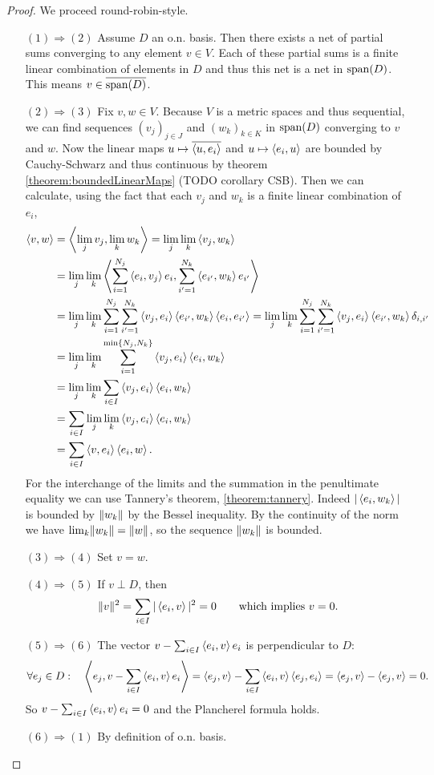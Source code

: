 \begin{proof}
We proceed round-robin-style.
\begin{itemize}[leftmargin=2cm]
\item[$\boxed{(1) \Rightarrow (2)}$] Assume $D$ an o.n. basis. Then there exists a net of partial sums converging to any element $v\in V$. Each of these partial sums is a finite linear combination of elements in $D$ and thus this net is a net in $\operatorname{span}(D)$. This means $v\in\overline{\operatorname{span}(D)}$.
\item[$\boxed{(2) \Rightarrow (3)}$] Fix $v,w\in V$. Because $V$ is a metric spaces and thus sequential, we can find sequences $(v_j)_{j\in J}$ and $(w_k)_{k\in K}$ in $\operatorname{span}(D)$ converging to $v$ and $w$. Now the linear maps $u\mapsto \overline{\left\langle u, e_i \right\rangle}$ and $u\mapsto \left\langle e_i, u \right\rangle$ are bounded by Cauchy-Schwarz and thus continuous by theorem \ref{theorem:boundedLinearMaps} (TODO corollary CSB). Then we can calculate, using the fact that each $v_j$ and $w_k$ is a finite linear combination of $e_i$,
\begin{align*}
\left\langle v,w \right\rangle &= \left\langle \lim_{j}v_j, \lim_k w_k \right\rangle = \lim_{j}\lim_{k}\left\langle v_j,w_k \right\rangle \\
&= \lim_{j}\lim_{k}\left\langle \sum_{i=1}^{N_{j}}\left\langle e_i,v_j \right\rangle e_i,\sum_{i'=1}^{N_k}\left\langle e_{i'},w_k \right\rangle e_{i'} \right\rangle \\
&= \lim_{j}\lim_{k}\sum_{i=1}^{N_{j}}\sum_{i'=1}^{N_k}\left\langle v_j,e_i \right\rangle\left\langle e_{i'},w_k \right\rangle\left\langle e_i,e_{i'} \right\rangle = \lim_{j}\lim_{k}\sum_{i=1}^{N_{j}}\sum_{i'=1}^{N_k}\left\langle v_j,e_i \right\rangle\left\langle e_{i'},w_k \right\rangle\delta_{i,i'} \\
&= \lim_{j}\lim_{k}\sum_{i=1}^{\min\{N_{j},N_{k}\}}\left\langle v_j,e_i \right\rangle\left\langle e_i,w_k \right\rangle \\
&= \lim_{j}\lim_{k}\sum_{i\in I}\left\langle v_j,e_i \right\rangle\left\langle e_i,w_k \right\rangle \\
&= \sum_{i\in I}\lim_{j}\lim_{k}\left\langle v_j,e_i \right\rangle\left\langle e_i,w_k \right\rangle \\
&= \sum_{i\in I}\left\langle v,e_i \right\rangle\left\langle e_i,w \right\rangle.
\end{align*}
For the interchange of the limits and the summation in the penultimate equality we can use Tannery's theorem, \ref{theorem:tannery}. Indeed $|\left\langle e_i,w_k \right\rangle|$ is bounded by $\lVert w_k\rVert$ by the Bessel inequality. By the continuity of the norm we have $\lim_k \lVert w_k\rVert = \lVert w\rVert$, so the sequence $\lVert w_k\rVert$ is bounded.
\item[$\boxed{(3) \Rightarrow (4)}$] Set $v=w$.
\item[$\boxed{(4) \Rightarrow (5)}$] If $v\perp D$, then
\[ \lVert v\rVert^2 = \sum_{i\in I}|\left\langle e_i,v \right\rangle|^2 = 0 \qquad\text{which implies $v=0$.} \]
\item[$\boxed{(5) \Rightarrow (6)}$] The vector $v-\sum_{i\in I}\left\langle e_i,v \right\rangle e_i$ is perpendicular to $D$:
\[ \forall e_j\in D: \quad \left\langle e_j, v-\sum_{i\in I}\left\langle e_i,v \right\rangle e_i \right\rangle = \left\langle e_j, v \right\rangle-\sum_{i\in I}\left\langle e_i,v \right\rangle\left\langle e_j,e_i \right\rangle = \left\langle e_j, v \right\rangle - \left\langle e_j, v \right\rangle = 0. \]
So $v-\sum_{i\in I}\left\langle e_i,v \right\rangle e_i = 0$ and the Plancherel formula holds.
\item[$\boxed{(6) \Rightarrow (1)}$] By definition of o.n. basis.
\end{itemize}
\end{proof}

